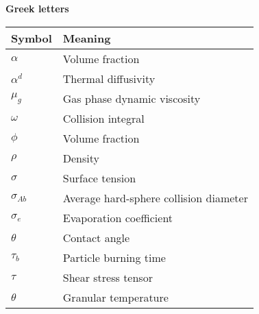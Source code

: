 \textbf{Greek letters}
\begin{table}[h!]
    \centering
    \begin{tabular}{w{c}{2cm} m{7cm}}
        \toprule
        Symbol & Meaning \\ 
        \midrule
        $\alpha$                & Volume fraction  \\
        $\alpha^d$              & Thermal diffusivity  \\
        $\mu_g $                & Gas phase dynamic viscosity\\
        $\omega$                & Collision integral \\
        $\phi$                  & Volume fraction\\
        $\rho$                  & Density  \\
        $\sigma$                & Surface tension \\
        $\sigma_{Ab}$           & Average hard-sphere collision diameter \\
        $\sigma_e$              & Evaporation coefficient \\
        $\theta$                & Contact angle\\
        $\tau_b$                & Particle burning time \\
        $\tau$                  & Shear stress tensor \\
        $\theta$                & Granular temperature \\
        \bottomrule
    \end{tabular}
    \label{tab:Nomenclature}
\end{table}


